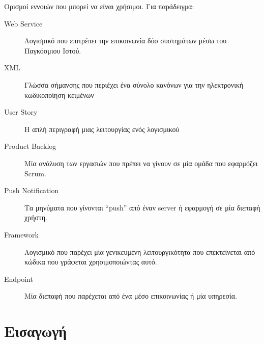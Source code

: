 \documentclass[oneside, 12pt]{book}
\begin{document}
\begin{Definitions}
Ορισμοί εννοιών που μπορεί να είναι χρήσιμοι. Για παράδειγμα:

\begin{description}
\item [Web Service] Λογισμικό που επιτρέπει την επικοινωνία δύο συστημάτων μέσω του Παγκόσμιου Ιστού.
\end{description}

\begin{description}
\item [XML] Γλώσσα σήμανσης που περιέχει ένα σύνολο κανόνων για την ηλεκτρονική κωδικοποίηση κειμένων
\end{description}

\begin{description}
\item [User Story] Η απλή περιγραφή μιας λειτουργίας ενός λογισμικού
\end{description}

\begin{description}
\item [Product Backlog] Μία ανάλυση των εργασιών που πρέπει να γίνουν σε μία ομάδα που εφαρμόζει Scrum.
\end{description}

\begin{description}
\item [Push Notification] Τα μηνύματα που γίνονται ``push'' από έναν server ή εφαρμογή σε μία διεπαφή χρήστη.
\end{description}

\begin{description}
\item [Framework] Λογισμικό που παρέχει μία γενικευμένη λειτουργικότητα που επεκτείνεται από κώδικα που γράφεται χρησιμοποιώντας αυτό.
\end{description}

\begin{description}
\item [Endpoint] Μία διεπαφή που παρέχεται από ένα μέσο επικοινωνίας ή μία υπηρεσία.
\end{description}

\end{Definitions}

\chapter{Εισαγωγή}
\end{document}
